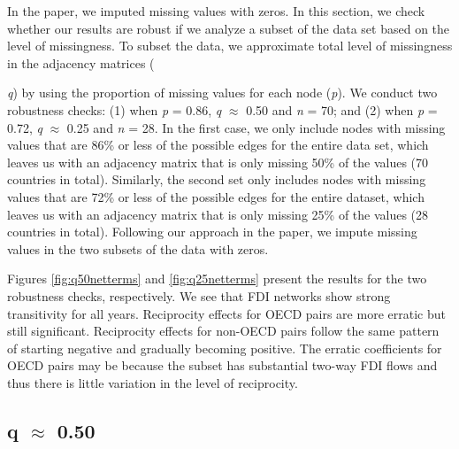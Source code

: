 \documentclass[reqno,onecolumn,letterpaper,12pt]{article}
\begin{document}
In the paper, we imputed missing values with zeros. In this section, we check whether our results are robust if we analyze a subset of the data set based on the level of missingness. To subset the data, we approximate total level of missingness in the adjacency matrices ({\emph{q}) by using the proportion of missing values for each node (\emph{p}). We conduct two robustness checks: (1) when \emph{p} = 0.86,  \emph{q} $\approx$ 0.50 and  \emph{n} = 70; and (2) when \emph{p} = 0.72, \emph{q} $\approx$ 0.25 and  \emph{n} = 28. In the first case, we only include nodes with missing values that are 86\% or less of the possible edges for the entire data set, which leaves us with an adjacency matrix that is only missing 50\% of the values (70 countries in total). Similarly, the second set only includes nodes with missing values that are 72\% or less of the possible edges for the entire dataset, which leaves us with an adjacency matrix that is only missing 25\% of the values (28 countries in total).  Following our approach in the paper, we impute missing values in the two subsets of the data with zeros.

Figures \ref{fig:q50netterms} and \ref{fig:q25netterms} present the results for the two robustness checks, respectively. We see that FDI networks show strong transitivity for all years. Reciprocity effects for OECD pairs are more erratic but still significant. Reciprocity effects for non-OECD pairs follow the same pattern of starting negative and gradually becoming positive. The erratic coefficients for OECD pairs may be because the subset has substantial two-way FDI flows and thus there is little variation in the level of reciprocity.\\


\subsection{q $\approx$  0.50}

}
\end{document}
